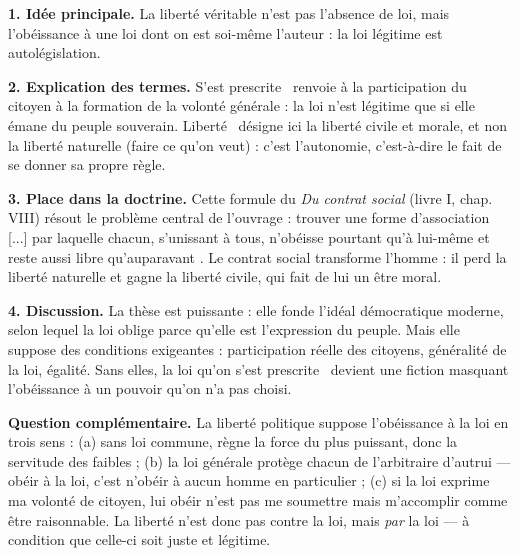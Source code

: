 \documentclass[11pt]{article}
\begin{document}
\begin{corrige}

\textbf{1. Idée principale.} La liberté véritable n'est pas l'absence de loi, mais l'obéissance à une loi dont on est soi-même l'auteur : la loi légitime est autolégislation.

\textbf{2. Explication des termes.} \guillemotleft S'est prescrite \guillemotright\ renvoie à la participation du citoyen à la formation de la volonté générale : la loi n'est légitime que si elle émane du peuple souverain. \guillemotleft Liberté \guillemotright\ désigne ici la liberté civile et morale, et non la liberté naturelle (faire ce qu'on veut) : c'est l'autonomie, c'est-à-dire le fait de se donner sa propre règle.

\textbf{3. Place dans la doctrine.} Cette formule du \emph{Du contrat social} (livre I, chap. VIII) résout le problème central de l'ouvrage : \guillemotleft trouver une forme d'association [...] par laquelle chacun, s'unissant à tous, n'obéisse pourtant qu'à lui-même et reste aussi libre qu'auparavant \guillemotright. Le contrat social transforme l'homme : il perd la liberté naturelle et gagne la liberté civile, qui fait de lui un être moral.

\textbf{4. Discussion.} La thèse est puissante : elle fonde l'idéal démocratique moderne, selon lequel la loi oblige parce qu'elle est l'expression du peuple. Mais elle suppose des conditions exigeantes : participation réelle des citoyens, généralité de la loi, égalité. Sans elles, la \guillemotleft loi qu'on s'est prescrite \guillemotright\ devient une fiction masquant l'obéissance à un pouvoir qu'on n'a pas choisi.

\textbf{Question complémentaire.} La liberté politique suppose l'obéissance à la loi en trois sens : (a) sans loi commune, règne la force du plus puissant, donc la servitude des faibles ; (b) la loi générale protège chacun de l'arbitraire d'autrui — obéir à la loi, c'est n'obéir à aucun homme en particulier ; (c) si la loi exprime ma volonté de citoyen, lui obéir n'est pas me soumettre mais m'accomplir comme être raisonnable. La liberté n'est donc pas contre la loi, mais \emph{par} la loi — à condition que celle-ci soit juste et légitime.

\end{corrige}
\end{document}
